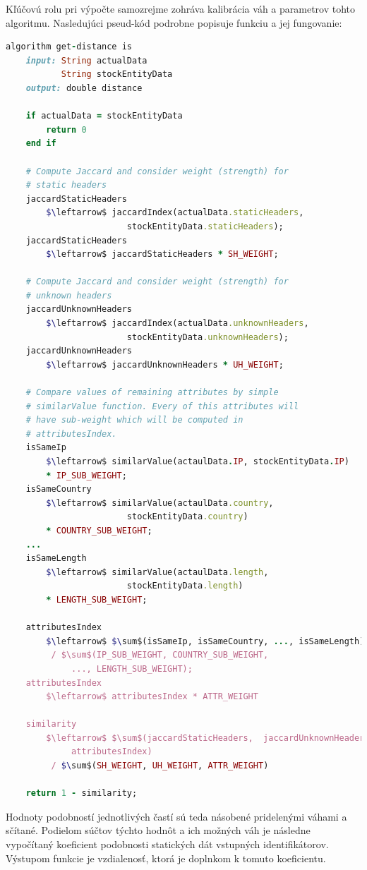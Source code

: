 \documentclass[
  printed, %
  table,   %
  lof,     %
  lot,     %
]{fithesis3}
\begin{document}
Kľúčovú rolu pri výpočte samozrejme zohráva kalibrácia váh a parametrov tohto
algoritmu. Nasledujúci pseud-kód podrobne popisuje funkciu a jej fungovanie:

\vspace{6mm}
\begin{lstlisting}[basicstyle=\footnotesize, language=Ruby, mathescape=true]
algorithm get-distance is
    input: String actualData
           String stockEntityData
    output: double distance

    if actualData = stockEntityData
        return 0
    end if

    # Compute Jaccard and consider weight (strength) for 
    # static headers
    jaccardStaticHeaders 
    	$\leftarrow$ jaccardIndex(actualData.staticHeaders, 
    	                stockEntityData.staticHeaders);
    jaccardStaticHeaders 
    	$\leftarrow$ jaccardStaticHeaders * SH_WEIGHT;

    # Compute Jaccard and consider weight (strength) for 
    # unknown headers
    jaccardUnknownHeaders 
    	$\leftarrow$ jaccardIndex(actualData.unknownHeaders,
    	                stockEntityData.unknownHeaders);
    jaccardUnknownHeaders 
    	$\leftarrow$ jaccardUnknownHeaders * UH_WEIGHT;

    # Compare values of remaining attributes by simple 
    # similarValue function. Every of this attributes will
    # have sub-weight which will be computed in
    # attributesIndex.
    isSameIp 
    	$\leftarrow$ similarValue(actaulData.IP, stockEntityData.IP)
    	* IP_SUB_WEIGHT;
    isSameCountry 
    	$\leftarrow$ similarValue(actaulData.country, 
    	                stockEntityData.country)
    	* COUNTRY_SUB_WEIGHT;
    ...
    isSameLength 
    	$\leftarrow$ similarValue(actaulData.length, 
    	                stockEntityData.length)
    	* LENGTH_SUB_WEIGHT;

    attributesIndex 
    	$\leftarrow$ $\sum$(isSameIp, isSameCountry, ..., isSameLength) 
    	 / $\sum$(IP_SUB_WEIGHT, COUNTRY_SUB_WEIGHT,
    	     ..., LENGTH_SUB_WEIGHT);
    attributesIndex 
    	$\leftarrow$ attributesIndex * ATTR_WEIGHT

    similarity 
    	$\leftarrow$ $\sum$(jaccardStaticHeaders,  jaccardUnknownHeaders,
    	     attributesIndex) 
    	 / $\sum$(SH_WEIGHT, UH_WEIGHT, ATTR_WEIGHT)

    return 1 - similarity;
\end{lstlisting}

Hodnoty podobností jednotlivých častí sú teda násobené pridelenými váhami a
sčítané. Podielom súčtov týchto hodnôt a ich možných váh je následne vypočítaný
koeficient podobnosti statických dát vstupných identifikátorov. Výstupom 
funkcie je vzdialenosť, ktorá je doplnkom k tomuto koeficientu.
\end{document}
